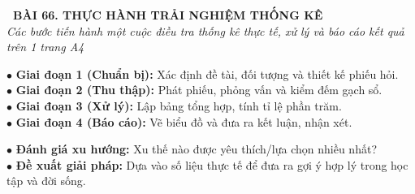 \documentclass[14pt,a4paper,oneside]{extbook}
\begin{document}
\noindent
\begin{tcolorbox}[
  enhanced,
  colback=teal!8!white,
  colframe=teal!80!black,
  arc=3mm,
  boxrule=1.1pt,
  width=\linewidth,
  halign=center,
  top=2.2mm, bottom=2.2mm,
  left=3mm, right=3mm,
  drop fuzzy shadow
]
  {\large\bfseries\color{teal!95!black}\faBookmark\ BÀI 66. THỰC HÀNH TRẢI NGHIỆM THỐNG KÊ}\\[2pt]
  {\scriptsize\color{black!75}\itshape Các bước tiến hành một cuộc điều tra thống kê thực tế, xử lý và báo cáo kết quả trên 1 trang A4}
\end{tcolorbox}

\vspace{3.2mm}
\noindent
\begin{minipage}[t]{0.56\textwidth}
  \begin{tcolorbox}[
    enhanced,
    title={\footnotesize\bfseries\color{white}\faTasks\ 1. Bốn giai đoạn điều tra thống kê},
    colback=blue!2!white,
    colframe=blue!75!black,
    arc=2.5mm, boxrule=0.8pt, top=1.8mm, bottom=1.8mm, left=2.2mm, right=2.2mm
  ]
    \footnotesize
    $\bullet$ \textbf{Giai đoạn 1 (Chuẩn bị):} Xác định đề tài, đối tượng và thiết kế phiếu hỏi.\\
    $\bullet$ \textbf{Giai đoạn 2 (Thu thập):} Phát phiếu, phỏng vấn và kiểm đếm gạch sổ.\\
    $\bullet$ \textbf{Giai đoạn 3 (Xử lý):} Lập bảng tổng hợp, tính tỉ lệ phần trăm.\\
    $\bullet$ \textbf{Giai đoạn 4 (Báo cáo):} Vẽ biểu đồ và đưa ra kết luận, nhận xét.
  \end{tcolorbox}
\end{minipage}%
\hfill
\begin{minipage}[t]{0.42\textwidth}
  \begin{tcolorbox}[
    enhanced,
    title={\footnotesize\bfseries\color{white}\faBullhorn\ 2. Kĩ năng nhận xét dữ liệu},
    colback=teal!2!white,
    colframe=teal!75!black,
    arc=2.5mm, boxrule=0.8pt, top=1.8mm, bottom=1.8mm, left=2mm, right=2mm
  ]
    \footnotesize
    $\bullet$ \textbf{Đánh giá xu hướng:} Xu thế nào được yêu thích/lựa chọn nhiều nhất?\\
    $\bullet$ \textbf{Đề xuất giải pháp:} Dựa vào số liệu thực tế để đưa ra gợi ý hợp lý trong học tập và đời sống.
  \end{tcolorbox}
\end{minipage}

\vspace{3mm}
\end{document}
